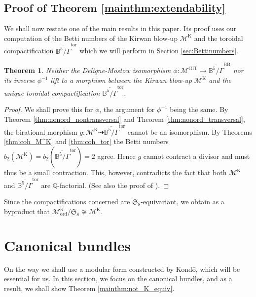 \documentclass[12pt, pdftex]{amsart}
\theoremstyle{plain}
\newtheorem{thm}{Theorem}[section]
\theoremstyle{definition}
\numberwithin{equation}{section}
\def\Q{{\mathbb Q}}
\def\B{{\mathbb B}}
\def\SS{{\mathfrak S}}
\def\ord{\mathrm{ord}}
\def\GIT{\mathrm{GIT}}
\def\K{\mathrm{K}}
\def\tor{\mathrm{tor}}
\def\BB{\mathrm{BB}}
\def\M{\mathcal{M}}
\begin{document}
\subsection{Proof of Theorem \ref{mainthm:extendability}}
We shall now restate one of the  main results in this paper. Its proof uses our computation of the Betti numbers of the Kirwan blow-up $\M^{\K}$ and the  toroidal compactification $\overline{\B^5/\Gamma}^{\tor}$
which we will perform in Section \ref{sec:Bettinumbers}.
\begin{thm}
\label{thm:not_extend}
Neither the Deligne-Mostow isomorphism $\phi:\M^{\GIT}\to\overline{\B^5/\Gamma}^{\BB}$ nor its inverse $\phi^{-1}$ lift to a morphism between the Kirwan blow-up $\M^{\K}$ and the unique toroidal compactification 
$\overline{\B^5/\Gamma}^{\tor}$.
\end{thm}
\begin{proof}
We shall prove this for $\phi$, the argument for $\phi^{-1}$ being the same. 
By Theorem \ref{thm:nonord_nontransversal} and Theorem  \ref{thm:nonord_transversal}, the birational morphism $g:\M^{\K}\dashrightarrow \overline{\B^5/\Gamma}^{\tor}$ cannot be an isomorphism.
By Theorems \ref{thm:coh_M^K} and \ref{thm:coh_tor} the Betti numbers $b_2(\M^{\K})=b_2( \overline{\B^5/\Gamma}^{\tor})=2$ agree. 
Hence $g$ cannot contract a divisor and must thus be a small contraction.
This, however, contradicts the fact that both $\M^{\K}$ and  $\overline{\B^5/\Gamma}^{\tor}$ are $\Q$-factorial.
(See also the proof of \cite[Theorem 1.1]{CMGHL22}).
\end{proof}
Since the compactifications concerned are $\SS_8$-equivariant, we obtain as a byproduct that $\M_{\ord}^{\K}/\SS_8\not\cong \M^{\K}$.

\section{Canonical bundles}
\label{section:canonical_bundles}
On the way we shall use a modular form constructed by Kond\={o}, which will be essential for us.
In this section, we focus on the canonical bundles, and as a result, we shall show Theorem \ref{mainthm:not_K_equiv}.
\end{document}
